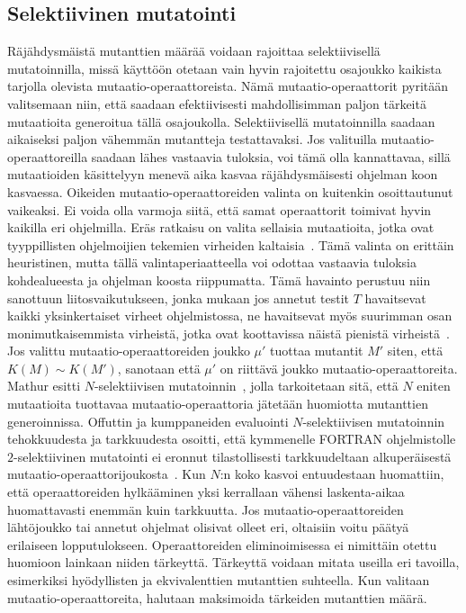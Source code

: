 \documentclass{tktltiki}
\begin{document}
\subsection{Selektiivinen mutatointi}
Räjähdysmäistä mutanttien määrää voidaan rajoittaa selektiivisellä mutatoinnilla, missä käyttöön otetaan vain hyvin rajoitettu osajoukko kaikista tarjolla olevista mutaatio-operaattoreista. Nämä mutaatio-operaattorit pyritään valitsemaan niin, että saadaan efektiivisesti mahdollisimman paljon tärkeitä mutaatioita generoitua tällä osajoukolla. Selektiivisellä mutatoinnilla saadaan aikaiseksi paljon vähemmän mutantteja testattavaksi. Jos valituilla mutaatio-operaattoreilla saadaan lähes vastaavia tuloksia, voi tämä olla kannattavaa, sillä mutaatioiden käsittelyyn menevä aika kasvaa räjähdysmäisesti ohjelman koon kasvaessa. Oikeiden mutaatio-operaattoreiden valinta on kuitenkin osoittautunut vaikeaksi. Ei voida olla varmoja siitä, että samat operaattorit toimivat hyvin kaikilla eri ohjelmilla. Eräs ratkaisu on valita sellaisia mutaatioita, jotka ovat tyyppillisten ohjelmoijien tekemien virheiden kaltaisia~\cite{GrunSZ09}. Tämä valinta on erittäin heuristinen, mutta tällä valintaperiaatteella voi odottaa vastaavia tuloksia kohdealueesta ja ohjelman koosta riippumatta. Tämä havainto perustuu niin sanottuun liitosvaikutukseen, jonka mukaan jos annetut testit $T$ havaitsevat kaikki yksinkertaiset virheet ohjelmistossa, ne havaitsevat myös suurimman osan monimutkaisemmista virheistä, jotka ovat koottavissa näistä pienistä virheistä~\cite{DeMilloLS78}. Jos valittu mutaatio-operaattoreiden joukko $\mu'$ tuottaa mutantit $M'$ siten, että $K(M) \sim K(M')$, sanotaan että $\mu'$ on riittävä joukko mutaatio-operaattoreita. Mathur esitti $N$-selektiivisen mutatoinnin~\cite{Mathur91}, jolla tarkoitetaan sitä, että $N$ eniten mutaatioita tuottavaa mutaatio-operaattoria jätetään huomiotta mutanttien generoinnissa. Offuttin ja kumppaneiden evaluointi $N$-selektiivisen mutatoinnin tehokkuudesta ja tarkkuudesta osoitti, että kymmenelle FORTRAN ohjelmistolle $2$-selektiivinen mutatointi ei eronnut tilastollisesti tarkkuudeltaan alkuperäisestä mutaatio-operaattorijoukosta~\cite{OffuttRZ93}. Kun $N$:n koko kasvoi entuudestaan huomattiin, että operaattoreiden hylkääminen yksi kerrallaan vähensi laskenta-aikaa huomattavasti enemmän kuin tarkkuutta. Jos mutaatio-operaattoreiden lähtöjoukko tai annetut ohjelmat olisivat olleet eri, oltaisiin voitu päätyä erilaiseen lopputulokseen. Operaattoreiden eliminoimisessa ei nimittäin otettu huomioon lainkaan niiden tärkeyttä. Tärkeyttä voidaan mitata useilla eri tavoilla, esimerkiksi hyödyllisten ja ekvivalenttien mutanttien suhteella. Kun valitaan mutaatio-operaattoreita, halutaan maksimoida tärkeiden mutanttien määrä.
\end{document}
